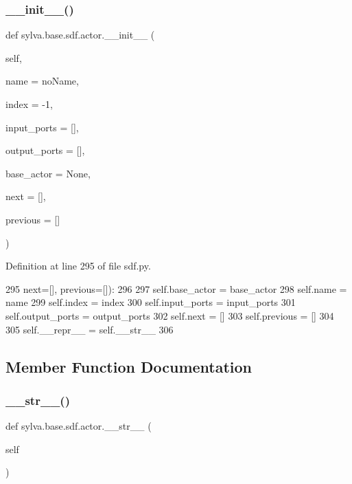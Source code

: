 \subsubsection{\texorpdfstring{\+\_\+\+\_\+init\+\_\+\+\_\+()}{\_\_init\_\_()}}
{\footnotesize\ttfamily def sylva.\+base.\+sdf.\+actor.\+\_\+\+\_\+init\+\_\+\+\_\+ (\begin{DoxyParamCaption}\item[{}]{self,  }\item[{}]{name = {\ttfamily \textquotesingle{}noName\textquotesingle{}},  }\item[{}]{index = {\ttfamily -\/1},  }\item[{}]{input\+\_\+ports = {\ttfamily \mbox{[}\mbox{]}},  }\item[{}]{output\+\_\+ports = {\ttfamily \mbox{[}\mbox{]}},  }\item[{}]{base\+\_\+actor = {\ttfamily None},  }\item[{}]{next = {\ttfamily \mbox{[}\mbox{]}},  }\item[{}]{previous = {\ttfamily \mbox{[}\mbox{]}} }\end{DoxyParamCaption})}



Definition at line 295 of file sdf.\+py.


\begin{DoxyCode}
295                      next=[], previous=[]):
296 
297             self.base\_actor = base\_actor
298             self.name = name
299             self.index = index
300             self.input\_ports = input\_ports
301             self.output\_ports = output\_ports
302             self.next = []
303             self.previous = []
304 
305             self.\_\_repr\_\_ = self.\_\_str\_\_
306 
\end{DoxyCode}


\subsection{Member Function Documentation}
\mbox{\label{classsylva_1_1base_1_1sdf_1_1actor_a248646977b9a90dee1b48077eacb9e6d}} 
\subsubsection{\texorpdfstring{\+\_\+\+\_\+str\+\_\+\+\_\+()}{\_\_str\_\_()}}
{\footnotesize\ttfamily def sylva.\+base.\+sdf.\+actor.\+\_\+\+\_\+str\+\_\+\+\_\+ (\begin{DoxyParamCaption}\item[{}]{self }\end{DoxyParamCaption})}




